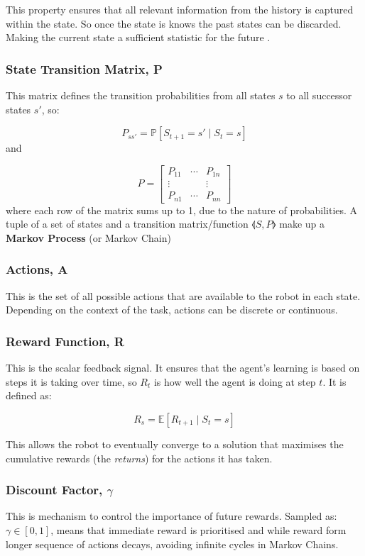     This property ensures that all relevant information from the history is captured within the state. So once the state is knows the past states can be discarded. Making the current state a sufficient statistic for the future \cite{silver2015}.

  \subsubsection{State Transition Matrix, P}
    This matrix defines the transition probabilities from all states $s$ to all successor states $s'$, so:
    
    \[ P_{ss'} = \mathbb{P} \left[S_{t+1} = s'  \mid S_t = s\right]\] 
    and 
    
    \[ P =
    \begin{bmatrix}
      P_{11} & \cdots & P_{1n} \\ 
      \vdots & & \vdots\\
      P_{n1} & \cdots & P_{nn}
    \end{bmatrix}
    \]
    where each row of the matrix sums up to 1, due to the nature of probabilities. A tuple of a set of states and a transition matrix/function \(\llangle S, P \rrangle\) make up a \textbf{Markov Process} (or Markov Chain)

  \subsubsection{Actions, A}
    This is the set of all possible actions that are available to the robot in each state. Depending on the context of the task, actions can be discrete or continuous.

  \subsubsection{Reward Function, R}
    This is the scalar feedback signal. It ensures that the agent's learning is based on steps it is taking over time, so $R_t$ is how well the agent is doing at step $t$. It is defined as:

    \[R_s = \mathbb{E} \left[R_{t+1} \mid S_t = s\right]\]
    
    This allows the robot to eventually converge to a solution that maximises the cumulative rewards (the \emph{returns}) for the actions it has taken. 
  
  \subsubsection{Discount Factor, $\gamma$}
    This is mechanism to control the importance of future rewards. Sampled as: \(\gamma \in \left[0, 1\right]\), means that immediate reward is prioritised and while reward form longer sequence of actions decays, avoiding infinite cycles in Markov Chains.

